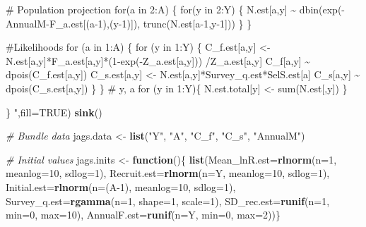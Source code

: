 \documentclass[
]{krantz}
\makeatletter
\newenvironment{Shaded}{\begin{snugshade}}{\end{snugshade}}
\newcommand{\AttributeTok}[1]{\textcolor[rgb]{0.27,0.27,0.27}{#1}}
\newcommand{\CommentTok}[1]{\textcolor[rgb]{0.37,0.37,0.37}{\textit{#1}}}
\newcommand{\ConstantTok}[1]{\textcolor[rgb]{0.37,0.37,0.37}{#1}}
\newcommand{\ControlFlowTok}[1]{\textcolor[rgb]{0.27,0.27,0.27}{\textbf{#1}}}
\newcommand{\DecValTok}[1]{\textcolor[rgb]{0.06,0.06,0.06}{#1}}
\newcommand{\FunctionTok}[1]{\textcolor[rgb]{0.27,0.27,0.27}{\textbf{#1}}}
\newcommand{\NormalTok}[1]{#1}
\newcommand{\OtherTok}[1]{\textcolor[rgb]{0.37,0.37,0.37}{#1}}
\newcommand{\StringTok}[1]{\textcolor[rgb]{0.5,0.5,0.5}{#1}}
\newenvironment{kframe}{%
\medskip{}
\setlength{\fboxsep}{.8em}
 \def\at@end@of@kframe{}%
 \ifinner\ifhmode%
  \def\at@end@of@kframe{\end{minipage}}%
  \begin{minipage}{\columnwidth}%
 \fi\fi%
 \def\FrameCommand##1{\hskip\@totalleftmargin \hskip-\fboxsep
 \colorbox{shadecolor}{##1}\hskip-\fboxsep
     \hskip-\linewidth \hskip-\@totalleftmargin \hskip\columnwidth}%
 \MakeFramed {\advance\hsize-\width
   \@totalleftmargin\z@ \linewidth\hsize
   \@setminipage}}%
 {\par\unskip\endMakeFramed%
 \at@end@of@kframe}
\renewenvironment{Shaded}{\begin{kframe}}{\end{kframe}}
\makeatother
\begin{document}
\begin{Shaded}
\begin{Highlighting}[]
\StringTok{    \# Population projection}
\StringTok{    for(a in 2:A) \{}
\StringTok{   for(y in 2:Y) \{}
\StringTok{     N.est[a,y] \textasciitilde{} dbin(exp({-}AnnualM{-}F\_a.est[(a{-}1),(y{-}1)]),}
\StringTok{                         trunc(N.est[a{-}1,y{-}1])) \} \}}

\StringTok{    \#Likelihoods}
\StringTok{    for (a in 1:A) \{}
\StringTok{   for (y in 1:Y) \{}
\StringTok{     C\_f.est[a,y] \textless{}{-} N.est[a,y]*F\_a.est[a,y]*(1{-}exp({-}Z\_a.est[a,y]))}
\StringTok{                      /Z\_a.est[a,y]}
\StringTok{     C\_f[a,y] \textasciitilde{} dpois(C\_f.est[a,y])}
\StringTok{     C\_s.est[a,y] \textless{}{-} N.est[a,y]*Survey\_q.est*SelS.est[a]}
\StringTok{     C\_s[a,y] \textasciitilde{} dpois(C\_s.est[a,y])}
\StringTok{   \} \} \# y, a}
\StringTok{   for (y in 1:Y)\{}
\StringTok{    N.est.total[y] \textless{}{-} sum(N.est[,y])}
\StringTok{   \}}

\StringTok{\}}
\StringTok{    "}\NormalTok{,}\AttributeTok{fill=}\ConstantTok{TRUE}\NormalTok{)}
\FunctionTok{sink}\NormalTok{()}

\CommentTok{\# Bundle data}
\NormalTok{jags.data }\OtherTok{\textless{}{-}} \FunctionTok{list}\NormalTok{(}\StringTok{"Y"}\NormalTok{, }\StringTok{"A"}\NormalTok{, }\StringTok{"C\_f"}\NormalTok{, }\StringTok{"C\_s"}\NormalTok{, }\StringTok{"AnnualM"}\NormalTok{)}

\CommentTok{\# Initial values}
\NormalTok{jags.inits }\OtherTok{\textless{}{-}} \ControlFlowTok{function}\NormalTok{()\{ }\FunctionTok{list}\NormalTok{(}\AttributeTok{Mean\_lnR.est=}\FunctionTok{rlnorm}\NormalTok{(}\AttributeTok{n=}\DecValTok{1}\NormalTok{, }\AttributeTok{meanlog=}\DecValTok{10}\NormalTok{, }\AttributeTok{sdlog=}\DecValTok{1}\NormalTok{),}
                               \AttributeTok{Recruit.est=}\FunctionTok{rlnorm}\NormalTok{(}\AttributeTok{n=}\NormalTok{Y, }\AttributeTok{meanlog=}\DecValTok{10}\NormalTok{, }\AttributeTok{sdlog=}\DecValTok{1}\NormalTok{),}
                               \AttributeTok{Initial.est=}\FunctionTok{rlnorm}\NormalTok{(}\AttributeTok{n=}\NormalTok{(A}\DecValTok{{-}1}\NormalTok{), }\AttributeTok{meanlog=}\DecValTok{10}\NormalTok{, }\AttributeTok{sdlog=}\DecValTok{1}\NormalTok{),}
                               \AttributeTok{Survey\_q.est=}\FunctionTok{rgamma}\NormalTok{(}\AttributeTok{n=}\DecValTok{1}\NormalTok{, }\AttributeTok{shape=}\DecValTok{1}\NormalTok{, }\AttributeTok{scale=}\DecValTok{1}\NormalTok{),}
                               \AttributeTok{SD\_rec.est=}\FunctionTok{runif}\NormalTok{(}\AttributeTok{n=}\DecValTok{1}\NormalTok{, }\AttributeTok{min=}\DecValTok{0}\NormalTok{, }\AttributeTok{max=}\DecValTok{10}\NormalTok{),}
                               \AttributeTok{AnnualF.est=}\FunctionTok{runif}\NormalTok{(}\AttributeTok{n=}\NormalTok{Y, }\AttributeTok{min=}\DecValTok{0}\NormalTok{, }\AttributeTok{max=}\DecValTok{2}\NormalTok{))\}}


\end{Highlighting}
\end{Shaded}
\end{document}
